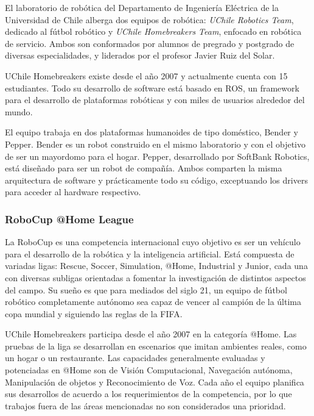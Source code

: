 El laboratorio de robótica del Departamento de Ingeniería Eléctrica de la Universidad de Chile alberga dos equipos de robótica: \textit{UChile Robotics Team}, dedicado al fútbol robótico y \textit{UChile Homebreakers Team}, enfocado en robótica de servicio. Ambos son conformados por alumnos de pregrado y postgrado de diversas especialidades, y liderados por el profesor Javier Ruiz del Solar\cite{uchile-robotics}.

UChile Homebreakers existe desde el año 2007 y actualmente cuenta con 15 estudiantes. Todo su desarrollo de software está basado en ROS, un framework para el desarrollo de plataformas robóticas y con miles de usuarios alrededor del mundo\cite{ROS:2009}.

El equipo trabaja en dos plataformas humanoides de tipo doméstico, Bender y Pepper. Bender es un robot construido en el mismo laboratorio y con el objetivo de ser un mayordomo para el hogar. Pepper, desarrollado por SoftBank Robotics, está diseñado para ser un robot de compañía. Ambos comparten la misma arquitectura de software y prácticamente todo su código, exceptuando los drivers para acceder al hardware respectivo.


\subsubsection{RoboCup @Home League}


La RoboCup es una competencia internacional cuyo objetivo es ser un vehículo para el desarrollo de la robótica y la inteligencia artificial. Está compuesta de variadas ligas: Rescue, Soccer, Simulation, @Home, Industrial y Junior, cada una con diversas subligas orientadas a fomentar la investigación de distintos aspectos del campo. Su sueño es que para mediados del siglo 21, un equipo de fútbol robótico completamente autónomo sea capaz de vencer al campión de la última copa mundial y siguiendo las reglas de la FIFA\cite{robocup:rulebook_2017}.

UChile Homebreakers participa desde el año 2007 en la categoría @Home. Las pruebas de la liga se desarrollan en escenarios que imitan ambientes reales, como un hogar o un restaurante. 
% 
Las capacidades generalmente evaluadas y potenciadas en @Home son de Visión Computacional, Navegación autónoma, Manipulación de objetos y Reconocimiento de Voz. Cada año el equipo planifica sus desarrollos de acuerdo a los requerimientos de la competencia, por lo que trabajos fuera de las áreas mencionadas no son considerados una prioridad.


